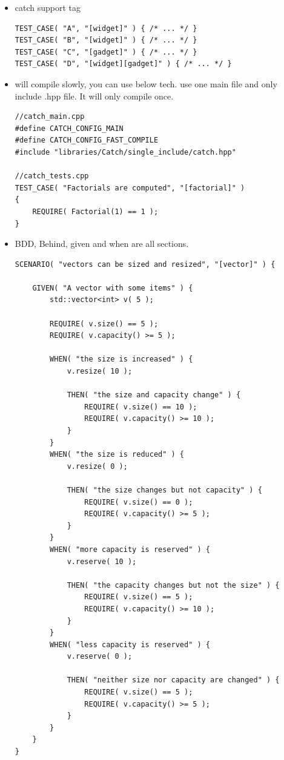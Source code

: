 \documentclass[a4paper,11pt,twoside]{book}
\begin{document}
\begin{itemize}
Section can also be nested,
\begin{lstlisting}
SECTION( "reserving bigger changes capacity but not size" ) {
	v.reserve( 10 );
	
	REQUIRE( v.size() == 5 );
	REQUIRE( v.capacity() >= 10 );
	SECTION( "reserving down unused capacity does not change capacity" ) {
		v.reserve( 7 );
		REQUIRE( v.size() == 5 );
		REQUIRE( v.capacity() >= 10 );
	}
}
\end{lstlisting}

\item catch support tag
\begin{lstlisting}
TEST_CASE( "A", "[widget]" ) { /* ... */ }
TEST_CASE( "B", "[widget]" ) { /* ... */ }
TEST_CASE( "C", "[gadget]" ) { /* ... */ }
TEST_CASE( "D", "[widget][gadget]" ) { /* ... */ }
\end{lstlisting}

\item will compile slowly, you can use below tech. use one main file and only include .hpp file. It will only compile once.
\begin{lstlisting}
//catch_main.cpp
#define CATCH_CONFIG_MAIN
#define CATCH_CONFIG_FAST_COMPILE
#include "libraries/Catch/single_include/catch.hpp"

//catch_tests.cpp
TEST_CASE( "Factorials are computed", "[factorial]" )
{
	REQUIRE( Factorial(1) == 1 );
}
\end{lstlisting}

\item BDD, Behind, given and when are all sections. 

\begin{lstlisting}
SCENARIO( "vectors can be sized and resized", "[vector]" ) {
	
	GIVEN( "A vector with some items" ) {
		std::vector<int> v( 5 );
		
		REQUIRE( v.size() == 5 );
		REQUIRE( v.capacity() >= 5 );
		
		WHEN( "the size is increased" ) {
			v.resize( 10 );
			
			THEN( "the size and capacity change" ) {
				REQUIRE( v.size() == 10 );
				REQUIRE( v.capacity() >= 10 );
			}
		}
		WHEN( "the size is reduced" ) {
			v.resize( 0 );
			
			THEN( "the size changes but not capacity" ) {
				REQUIRE( v.size() == 0 );
				REQUIRE( v.capacity() >= 5 );
			}
		}
		WHEN( "more capacity is reserved" ) {
			v.reserve( 10 );
			
			THEN( "the capacity changes but not the size" ) {
				REQUIRE( v.size() == 5 );
				REQUIRE( v.capacity() >= 10 );
			}
		}
		WHEN( "less capacity is reserved" ) {
			v.reserve( 0 );
			
			THEN( "neither size nor capacity are changed" ) {
				REQUIRE( v.size() == 5 );
				REQUIRE( v.capacity() >= 5 );
			}
		}
	}
}
\end{lstlisting}

\end{itemize}
\end{document}
